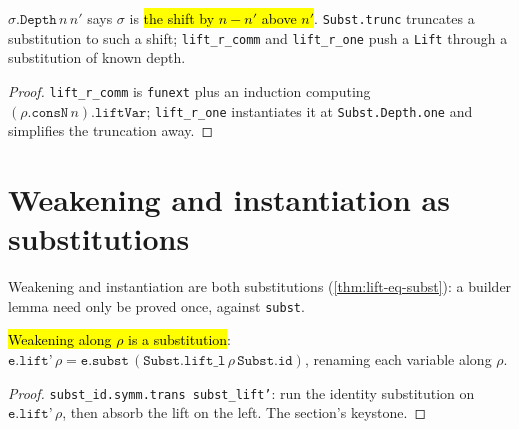 \begin{lemma}
\label{fam:subst-trunc-orphans}
\leanok
{}

 $\sigma.\texttt{Depth}\,n\,n'$ says $\sigma$ is \hl{the shift by
$n{-}n'$ above $n'$}.
\texttt{Subst.trunc} truncates a substitution to such a shift; \texttt{lift\_r\_comm}
and \texttt{lift\_r\_one} push a \texttt{Lift} through a substitution of known depth.
\end{lemma}
\begin{proof}
\leanok
{} \texttt{lift\_r\_comm} is \texttt{funext} plus an induction computing
$(\rho.\texttt{consN}\,n).\texttt{liftVar}$; \texttt{lift\_r\_one} instantiates it at
\texttt{Subst.Depth.one} and simplifies the truncation away.
\end{proof}

\section{Weakening and instantiation as substitutions}

Weakening and instantiation are both substitutions (\ref{thm:lift-eq-subst}): a builder
lemma need only be proved once, against \texttt{subst}.

\begin{theorem}
\label{thm:lift-eq-subst}
\leanok
{} 

 \hl{Weakening along $\rho$ is a substitution}:
$\texttt{e.lift'}\,\rho = \texttt{e.subst}\,(\texttt{Subst.lift\_l}\,\rho\,\texttt{Subst.id})$,
renaming each variable along $\rho$.
\end{theorem}
\begin{proof}
\leanok
{} \texttt{subst\_id.symm.trans subst\_lift'}: run the identity substitution on
$\texttt{e.lift'}\,\rho$, then absorb the lift on the left. The section's keystone.
\end{proof}

